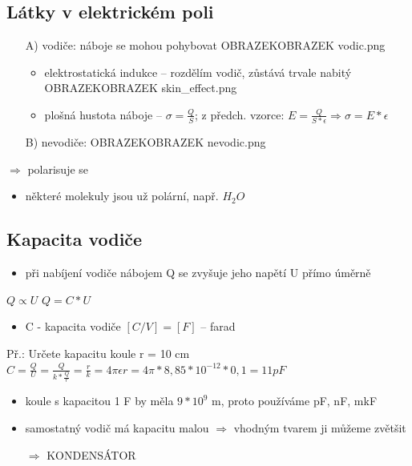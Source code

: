 \documentclass{article}
\begin{document}
\subsection{Látky v elektrickém poli}
\begin{itemize}
  \item[A)] vodiče: náboje se mohou pohybovat OBRAZEKOBRAZEK vodic.png
  \begin{itemize}
    \item elektrostatická indukce -- rozdělím vodič, zůstává trvale nabitý OBRAZEKOBRAZEK skin_effect.png
    \item plošná hustota náboje -- $\sigma = \frac{Q}{S}$; z předch. vzorce: $E = \frac{Q}{S*\epsilon} \Rightarrow \sigma = E*\epsilon$
  \end{itemize}
  \item[B)] nevodiče: OBRAZEKOBRAZEK nevodic.png
\end{itemize}
$\Rightarrow$ polarisuje se
\begin{itemize}
  \begin{itemize}
    \item některé molekuly jsou už  polární, např. $H_2O$
  \end{itemize}
\end{itemize}
\subsection{Kapacita vodiče}
\begin{itemize}
  \item při nabíjení vodiče nábojem Q se zvyšuje jeho napětí U přímo úměrně
\end{itemize}
  $Q \propto U$
  $Q = C*U$
\begin{itemize}
  \item C - kapacita vodiče $[C/V] = [F]$ -- farad
\end{itemize}
Př.: Určete kapacitu koule r = 10 cm
$C = \frac{Q}{U} = \frac{Q}{k*\frac{Q}{r}} = \frac{r}{k} = 4\pi \epsilon r = 4\pi*8,85*10^{-12}*0,1 = 11 pF$
\begin{itemize}
  \item koule s kapacitou 1 F by měla $9*10^{9}$ m, proto používáme pF, nF, mkF
  \item samostatný vodič má kapacitu malou $\Rightarrow$ vhodným tvarem ji můžeme zvětšit
  \item[ $\Rightarrow$ ] KONDENSÁTOR
\end{itemize}
\end{document}
